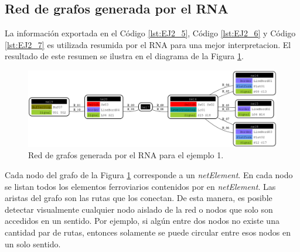 \subsection{Red de grafos generada por el RNA}

	 La información exportada en el Código \ref{lst:EJ2_5}, Código \ref{lst:EJ2_6} y Código \ref{lst:EJ2_7} es utilizada resumida por el RNA para una mejor interpretacion. El resultado de este resumen se ilustra en el diagrama de la Figura \ref{fig:EJ2_8}.
	
	\begin{figure}[H]
		\centering
		\includegraphics[width=1\textwidth]{Figuras/Graph_2}
		\centering\caption{Red de grafos generada por el RNA para el ejemplo 1.}
		\label{fig:EJ2_8}
	\end{figure}
	
	Cada nodo del grafo de la Figura \ref{fig:EJ2_8} corresponde a un \textit{netElement}. En cada nodo se listan todos los elementos ferroviarios contenidos por en \textit{netElement}. Las aristas del grafo son las rutas que los conectan. De esta manera, es posible detectar visualmente cualquier nodo aislado de la red o nodos que solo son accedidos en un sentido. Por ejemplo, si algún entre dos nodos no existe una cantidad par de rutas, entonces solamente se puede circular entre esos nodos en un solo sentido.